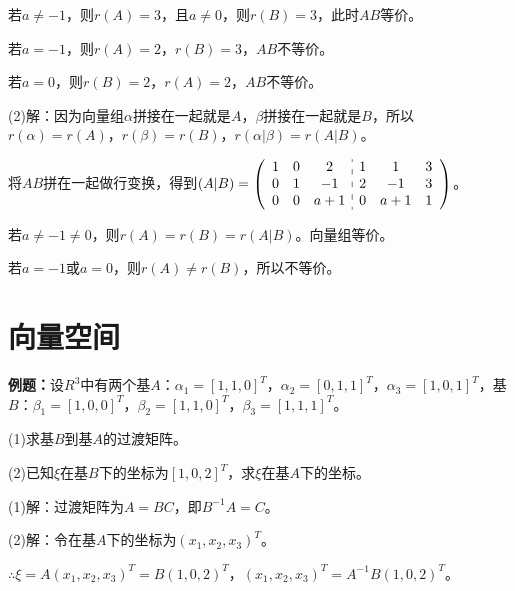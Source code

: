 \documentclass[UTF8, 12pt]{ctexart}
\begin{document}
若$a\neq-1$，则$r(A)=3$，且$a\neq0$，则$r(B)=3$，此时$AB$等价。

若$a=-1$，则$r(A)=2$，$r(B)=3$，$AB$不等价。

若$a=0$，则$r(B)=2$，$r(A)=2$，$AB$不等价。

(2)解：因为向量组$\alpha$拼接在一起就是$A$，$\beta$拼接在一起就是$B$，所以$r(\alpha)=r(A)$，$r(\beta)=r(B)$，$r(\alpha|\beta)=r(A|B)$。

将$AB$拼在一起做行变换，得到$(A|B)=\left(\begin{array}{c:c}
    \begin{matrix}
        1 & 0 & 2 \\
        0 & 1 & -1 \\
        0 & 0 & a+1
    \end{matrix}&
    \begin{matrix}
        1 & 1 & 3 \\
        2 & -1 & 3 \\
        0 & a+1 & 1
    \end{matrix}
\end{array}\right)$。\medskip

若$a\neq-1\neq0$，则$r(A)=r(B)=r(A|B)$。向量组等价。

若$a=-1$或$a=0$，则$r(A)\neq r(B)$，所以不等价。

\section{向量空间}

\textbf{例题：}设$R^3$中有两个基$A$：$\alpha_1=[1,1,0]^T$，$\alpha_2=[0,1,1]^T$，$\alpha_3=[1,0,1]^T$，基$B$：$\beta_1=[1,0,0]^T$，$\beta_2=[1,1,0]^T$，$\beta_3=[1,1,1]^T$。

(1)求基$B$到基$A$的过渡矩阵。

(2)已知$\xi$在基$B$下的坐标为$[1,0,2]^T$，求$\xi$在基$A$下的坐标。

(1)解：过渡矩阵为$A=BC$，即$B^{-1}A=C$。

(2)解：令在基$A$下的坐标为$(x_1,x_2,x_3)^T$。

$\therefore\xi=A(x_1,x_2,x_3)^T=B(1,0,2)^T$，$(x_1,x_2,x_3)^T=A^{-1}B(1,0,2)^T$。
\end{document}
